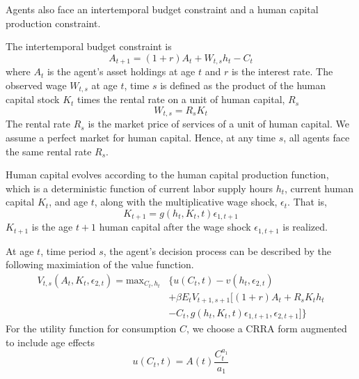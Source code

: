 \documentclass{article}
\begin{document}
Agents also face an intertemporal budget constraint and a human capital production constraint. \par
The intertemporal budget constraint is
\begin{equation} \tag{2}
A_{t+1} = (1 + r)A_t + W_{t,s}h_t - C_t
\end{equation}
where $A_t$ is the agent's asset holdings at age $t$ and $r$ is the interest rate. The observed wage $W_{t,s}$ at age $t$, time $s$ is defined as the product of the human capital stock $K_t$ times the rental rate on a unit of human capital, $R_s$
\begin{equation} \tag{3}
W_{t,s}=R_sK_t
\end{equation}
The rental rate $R_s$ is the market price of services of a unit of human capital. We assume a perfect market for human capital. Hence, at any time $s$, all agents face the same rental rate $R_s$. \par
Human capital evolves according to the human capital production function, which is a deterministic function of current labor supply hours $h_t$, current human capital $K_t$, and age $t$, along with the multiplicative wage shock, $\epsilon_t$. That is,
\begin{equation} \tag{4}
  \label{eq:HCevolution}
  K_{t+1} = g(h_t, K_t, t) \epsilon_{1,t+1}
\end{equation}
$K_{t+1}$ is the age $t+1$ human capital after the wage shock $\epsilon_{1,t+1}$ is realized. \par
At age $t$, time period $s$, the agent's decision process can be described by the following maximiation of the value function.
\begin{equation} \tag{5}
  \begin{split}
      V_{t,s}(A_t,K_t,\epsilon_{2,t})=\text{max}_{C_t,h_t} & \{u(C_t,t)-v(h_t, \epsilon_{2,t}) \\ & + \beta E_t V_{t+1,s+1}[(1+r)A_t + R_s K_t h_t \\ & -C_t, g(h_t,K_t,t)\epsilon_{1,t+1}, \epsilon_{2,t+1}]\}
  \end{split}
\end{equation}
    For the utility function for consumption $C$, we choose a CRRA form augmented to include age effects
    \begin{equation*}
      u(C_t,t)=A(t)\dfrac{C_t^{a_1}}{a_1}
    \end{equation*}
\end{document}
